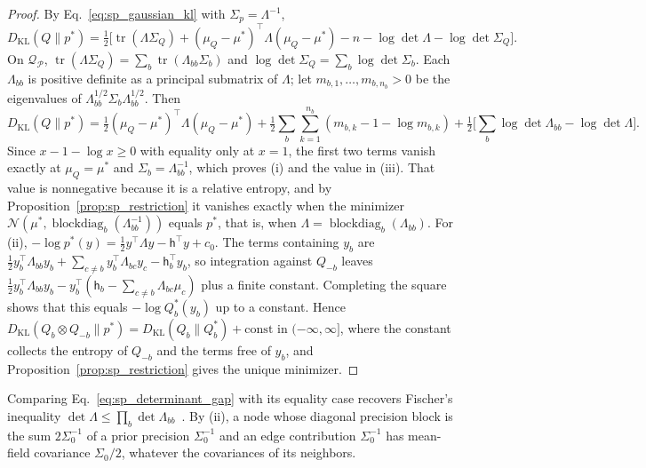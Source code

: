 \begin{proof}
By Eq.~\eqref{eq:sp_gaussian_kl} with $\Sigma_p=\Lambda^{-1}$,
\begin{equation*}
D_{\mathrm{KL}}(Q\|p^*)=\tfrac12\big[\operatorname{tr}(\Lambda\Sigma_Q)+(\mu_Q-\mu^*)^\top\Lambda(\mu_Q-\mu^*)-n-\log\det\Lambda-\log\det\Sigma_Q\big].
\end{equation*}
On $\mathcal Q_{\mathcal P}$, $\operatorname{tr}(\Lambda\Sigma_Q)=\sum_b\operatorname{tr}(\Lambda_{bb}\Sigma_b)$ and $\log\det\Sigma_Q=\sum_b\log\det\Sigma_b$. Each $\Lambda_{bb}$ is positive definite as a principal submatrix of $\Lambda$; let $m_{b,1},\ldots,m_{b,n_b}>0$ be the eigenvalues of $\Lambda_{bb}^{1/2}\Sigma_b\Lambda_{bb}^{1/2}$. Then
\begin{equation}
D_{\mathrm{KL}}(Q\|p^*)
=\tfrac12(\mu_Q-\mu^*)^\top\Lambda(\mu_Q-\mu^*)
+\tfrac12\sum_b\sum_{k=1}^{n_b}(m_{b,k}-1-\log m_{b,k})
+\tfrac12\Big[\sum_b\log\det\Lambda_{bb}-\log\det\Lambda\Big].
\label{eq:sp_block_decomposition}
\end{equation}
Since $x-1-\log x\geq0$ with equality only at $x=1$, the first two terms vanish exactly at $\mu_Q=\mu^*$ and $\Sigma_b=\Lambda_{bb}^{-1}$, which proves (i) and the value in (iii). That value is nonnegative because it is a relative entropy, and by Proposition~\ref{prop:sp_restriction} it vanishes exactly when the minimizer $\mathcal N(\mu^*,\operatorname{blockdiag}_b(\Lambda_{bb}^{-1}))$ equals $p^*$, that is, when $\Lambda=\operatorname{blockdiag}_b(\Lambda_{bb})$.
For (ii), $-\log p^*(y)=\tfrac12y^\top\Lambda y-\mathsf h^\top y+c_0$. The terms containing $y_b$ are $\tfrac12y_b^\top\Lambda_{bb}y_b+\sum_{c\neq b}y_b^\top\Lambda_{bc}y_c-\mathsf h_b^\top y_b$, so integration against $Q_{-b}$ leaves $\tfrac12y_b^\top\Lambda_{bb}y_b-y_b^\top(\mathsf h_b-\sum_{c\neq b}\Lambda_{bc}\mu_c)$ plus a finite constant. Completing the square shows that this equals $-\log Q_b^*(y_b)$ up to a constant. Hence $D_{\mathrm{KL}}(Q_b\otimes Q_{-b}\|p^*)=D_{\mathrm{KL}}(Q_b\|Q_b^*)+\mathrm{const}$ in $(-\infty,\infty]$, where the constant collects the entropy of $Q_{-b}$ and the terms free of $y_b$, and Proposition~\ref{prop:sp_restriction} gives the unique minimizer.
\end{proof}
Comparing Eq.~\eqref{eq:sp_determinant_gap} with its equality case recovers Fischer's inequality $\det\Lambda\leq\prod_b\det\Lambda_{bb}$~\cite{HornJohnson2013}. By (ii), a node whose diagonal precision block is the sum $2\Sigma_0^{-1}$ of a prior precision $\Sigma_0^{-1}$ and an edge contribution $\Sigma_0^{-1}$ has mean-field covariance $\Sigma_0/2$, whatever the covariances of its neighbors.

